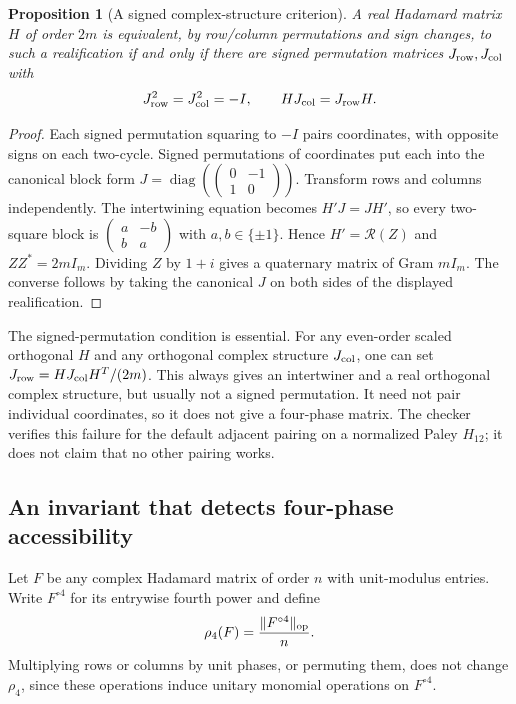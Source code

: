 \documentclass[11pt]{article}
\newtheorem{proposition}[theorem]{Proposition}
\begin{document}
\begin{proposition}[A signed complex-structure criterion]
\label{quat:structure}
A real Hadamard matrix $H$ of order $2m$ is equivalent, by row/column
permutations and sign changes, to such a realification if and only if there are signed
permutation matrices $J_{\rm row},J_{\rm col}$ with
\[
 J_{\rm row}^2=J_{\rm col}^2=-I,\qquad
                         HJ_{\rm col}=J_{\rm row}H.
\]
\end{proposition}
\begin{proof}
Each signed permutation squaring to $-I$ pairs coordinates, with
opposite signs on each two-cycle. Signed permutations of coordinates
put each into the canonical block form
$J=\operatorname{diag}(\left(\begin{smallmatrix}0&-1\\1&0\end{smallmatrix}\right))$.
Transform rows and columns independently. The intertwining equation
becomes $H'J=JH'$, so every two-square block is
$\left(\begin{smallmatrix}a&-b\\b&a\end{smallmatrix}\right)$ with
$a,b\in\{\pm1\}$. Hence $H'=\mathcal R(Z)$ and
$ZZ^*=2mI_m$. Dividing $Z$ by $1+i$ gives a quaternary matrix
of Gram $mI_m$. The converse follows by taking the canonical $J$
on both sides of the displayed realification.
\end{proof}

The signed-permutation condition is essential. For any even-order
scaled orthogonal $H$ and any orthogonal complex structure $J_{\rm col}$,
one can set $J_{\rm row}=HJ_{\rm col}H^T/(2m)$. This always gives
an intertwiner and a real orthogonal complex structure, but usually
not a signed permutation. It need not pair individual coordinates,
so it does not give a four-phase matrix. The checker verifies this
failure for the default adjacent pairing on a normalized Paley $H_{12}$;
it does not claim that no other pairing works.

\subsection{An invariant that detects four-phase accessibility}
Let $F$ be any complex Hadamard matrix of order $n$ with unit-modulus
entries. Write $F^{\circ4}$ for its entrywise fourth power and define
\[
                 \rho_4(F)=\frac{\|F^{\circ4}\|_{\rm op}}n.
\]
Multiplying rows or columns by unit phases, or permuting them, does
not change $\rho_4$, since these operations induce unitary monomial
operations on $F^{\circ4}$.
\end{document}
